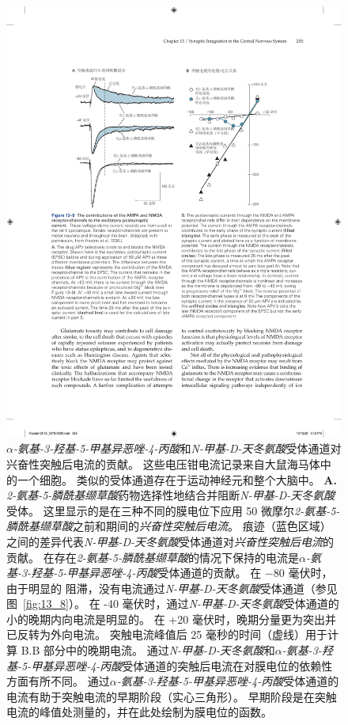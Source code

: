 \begin{figure}[htbp]
	\centering
	\includegraphics[width=0.75\linewidth]{chap13/fig_13_9}
	\caption{\textit{$\alpha$-氨基-3-羟基-5-甲基异恶唑-4-丙酸}和\textit{N-甲基-D-天冬氨酸}受体通道对兴奋性突触后电流的贡献。
		这些电压钳电流记录来自大鼠海马体中的一个细胞。
		类似的受体通道存在于运动神经元和整个大脑中\cite{hestrin1990analysis}。
	\textbf{A.} \textit{2-氨基-5-膦酰基缬草酸}药物选择性地结合并阻断\textit{N-甲基-D-天冬氨酸}受体。
	这里显示的是在三种不同的膜电位下应用 50 微摩尔\textit{2-氨基-5-膦酰基缬草酸}之前和期间的\textit{兴奋性突触后电流}。
	痕迹（蓝色区域）之间的差异代表\textit{N-甲基-D-天冬氨酸}受体通道对\textit{兴奋性突触后电流}的贡献。
	在存在\textit{2-氨基-5-膦酰基缬草酸}的情况下保持的电流是\textit{$\alpha$-氨基-3-羟基-5-甲基异恶唑-4-丙酸}受体通道的贡献。
	在 −80 毫伏时，由于明显的  阻滞，没有电流通过\textit{N-甲基-D-天冬氨酸}受体通道（参见图~\ref{fig:13_8}）。
	在 -40 毫伏时，通过\textit{N-甲基-D-天冬氨酸}受体通道的小的晚期内向电流是明显的。 
	在 +20 毫伏时，晚期分量更为突出并已反转为外向电流。
	突触电流峰值后 25 毫秒的时间（虚线）用于计算 B.B 部分中的晚期电流。
	通过\textit{N-甲基-D-天冬氨酸}和\textit{$\alpha$-氨基-3-羟基-5-甲基异恶唑-4-丙酸}受体通道的突触后电流在对膜电位的依赖性方面有所不同。
	通过\textit{$\alpha$-氨基-3-羟基-5-甲基异恶唑-4-丙酸}受体通道的电流有助于突触电流的早期阶段（实心三角形）。
	早期阶段是在突触电流的峰值处测量的，并在此处绘制为膜电位的函数。
}
\end{figure}
